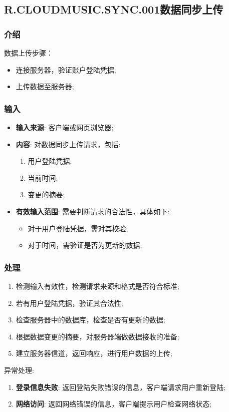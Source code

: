 \subsection{R.CLOUDMUSIC.SYNC.001数据同步上传}
\subsubsection{介绍}
	数据上传步骤：
	\begin{itemize}
		\item 连接服务器，验证账户登陆凭据;
		\item 上传数据至服务器;
	\end{itemize}
\subsubsection{输入}
	\begin{itemize}
		\item \textbf{输入来源}: 客户端或网页浏览器;
		\item \textbf{内容}: 对数据同步上传请求，包括: 
		\begin{enumerate}
			\item 用户登陆凭据;
			\item 当前时间;
			\item 变更的摘要;
		\end{enumerate}
		\item \textbf{有效输入范围}: 需要判断请求的合法性，具体如下: 
		\begin{itemize}
			\item 对于用户登陆凭据，需对其校验; 
			\item 对于时间，需验证是否为更新的数据; 
		\end{itemize}
	\end{itemize}
\subsubsection{处理}
	\begin{enumerate}
		\item 检测输入有效性，检测请求来源和格式是否符合标准;
		\item 若有用户登陆凭据，验证其合法性;
		\item 检查服务器中的数据库，检查是否有更新的数据;
		\item 根据数据变更的摘要，对服务器端做数据接收的准备;
		\item 建立服务器信道，返回响应，进行用户数据的上传;
	\end{enumerate}
	\noindent 异常处理: 
	\begin{enumerate}
		\item \textbf{登录信息失败}: 返回登陆失败错误的信息，客户端请求用户重新登陆;
		\item \textbf{网络访问}: 返回网络错误的信息，客户端提示用户检查网络状态;
	\end{enumerate}
